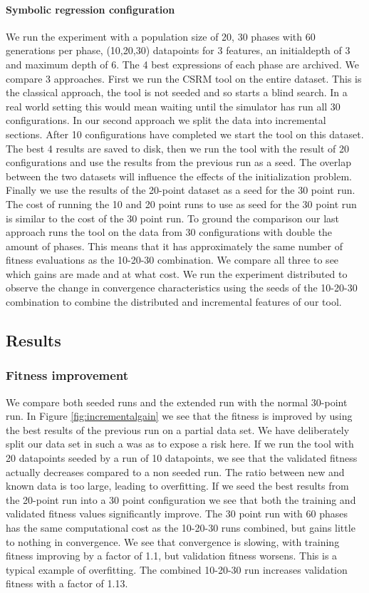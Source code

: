 \paragraph{Symbolic regression configuration}
We run the experiment with a population size of 20, 30 phases with 60 generations per phase, (10,20,30) datapoints for 3 features, an initialdepth of 3 and maximum depth of 6. The 4 best expressions of each phase are archived.
We compare 3 approaches. First we run the CSRM tool on the entire dataset. This is the classical approach, the tool is not seeded and so starts a blind search. In a real world setting this would mean waiting until the simulator has run all 30 configurations.
In our second approach we split the data into incremental sections. After 10 configurations have completed we start the tool on this dataset. 
The best 4 results are saved to disk, then we run the tool with the result of 20 configurations and use the results from the previous run as a seed. The overlap between the two datasets will influence the effects of the initialization problem. Finally we use the results of the 20-point dataset as a seed for the 30 point run. 
The cost of running the 10 and 20 point runs to use as seed for the 30 point run is similar to the cost of the 30 point run. 
To ground the comparison our last approach runs the tool on the data from 30 configurations with double the amount of phases. This means that it has approximately the same number of fitness evaluations as the 10-20-30 combination. We compare all three to see which gains are made and at what cost.
We run the experiment distributed to observe the change in convergence characteristics using the seeds of the 10-20-30 combination to combine the distributed and incremental features of our tool.
\subsection{Results}
\subsubsection{Fitness improvement}
We compare both seeded runs and the extended run with the normal 30-point run. In Figure \ref{fig:incrementalgain} we see that the fitness is improved by using the best results of the previous run on a partial data set. We have deliberately split our data set in such a was as to expose a risk here. If we run the tool with 20 datapoints seeded by a run of 10 datapoints, we see that the validated fitness actually decreases compared to a non seeded run. The ratio between new and known data is too large, leading to overfitting. If we seed the best results from the 20-point run into a 30 point configuration we see that both the training and validated fitness values significantly improve. 
The 30 point run with 60 phases has the same computational cost as the 10-20-30 runs combined, but gains little to nothing in convergence. We see that convergence is slowing, with training fitness improving by a factor of 1.1, but validation fitness worsens. This is a typical example of overfitting. The combined 10-20-30 run increases validation fitness with a factor of 1.13.
